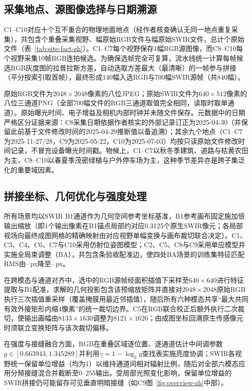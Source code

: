 \documentclass[UTF8,a4paper,10pt]{ctexart}
\begin{document}
\subsection{采集地点、源图像选择与日期溯源}\label{sec:source}
C1--C10对应十个互不重合的物理地面地点（经作者核查确认无同一地点重复采集），共包含\DatasetSourcePositionCount{}个重叠采集视野、\DatasetRgbFrameCount{}幅原始RGB文件与\DatasetSwirFrameCount{}幅原始SWIR文件，总计\DatasetRawFileCount{}个原始文件（表~\ref{tab:site-fact-zh}）。C1--C7每个视野保存1幅RGB源图像，而C8--C10每个视野采集10帧RGB连拍候选。为确保选帧完全可复算，流水线统一计算每帧候选RGB灰度图的拉普拉斯方差，自动选取方差最大（最清晰）的一帧参与拼接（平分按索引取首帧），最终形成140幅入选RGB与700幅SWIR源帧（共840幅）。

原始RGB文件为$2048\times2048$像素的八位JPEG；原始SWIR文件为$640\times512$像素的八位三通道PNG（全部700幅文件的RGB三通道取值完全相同，读取时取单通道）。原始曝光时间、电子增益及相机内部时钟并未随文件保存。元数据中的日期严格区分证据来源：C8采集日期依据作者核实的外部记录订正为2025-04-30（并保留此前基于文件修改时间的2025-04-29推断值以备追溯）；其余九个地点（C1--C7为2025-11-27/28，C9为2025-05-22，C10为2025-07-03）均按只读原始文件修改时间记录，不冒充设备曝光时间戳。物候上，C1--C7以秋冬季建筑、道路与枯黄农田为主，C8--C10以春夏季茂密绿植与户外停车场为主，这种季节差异亦是跨子集泛化的重要域因素。

\subsection{拼接坐标、几何优化与强度处理}
所有场景均以SWIR B1通道作为几何空间参考坐标基准，B1参考画布固定施加\DatasetOutputScale{}倍输出缩放（即1个输出像素在B1锚点局部约对应0.3125个原生SWIR像元；各局部视场向最终成图网格的精确映射由对应视野单幅变换与画布裁切联合决定）。C1、C3、C4、C6、C7与C10采用仿射位姿图模型；C2、C5、C8与C9采用单应模型并实施全局束调整（BA），共包含\DatasetPoseEdgeCount{}条验收配准边，使四处BA场景的训练集特征匹配RMS由\GeomBaBeforeMin--\GeomBaBeforeMax\,px降至\GeomBaAfterMin--\GeomBaAfterMax\,px。

在跨模态与通道对齐中，选中的RGB源帧经面积插值下采样至$640\times640$进行特征提取与B1配准，求解的几何投影包含该预缩放矩阵并直接对$2048\times2048$原始RGB执行三次插值重采样（覆盖掩膜用最近邻插值），随后所有六种模态共享“最大共同有效外接矩形内缩4像素”的统一裁切边界。C5在RGB联合校正后额外执行二次裁切，使输出画幅由$8133\times1630$调整为$8121\times1626$；由成图坐标回溯原生传感像元时须联立变换矩阵与该次裁切偏移。

在强度与接缝融合方面，RGB在重叠区域逐位置、逐通道估计中间调参数$g\in[0.663943,1.345289]$并利用$\gamma=1-\log_2 g$查找表实施亮度协调；SWIR各视野统一保留单位增益（均为1）以维持通道间相对辐射比例，随后对全部六模态应用分频接缝混合并截断至0--255输出。受局部光照变化影响，保留单位增益的SWIR拼接仍可能留存可见垂直明暗接缝（如C9图~\ref{fig:overview-zh}中部）。
\end{document}
